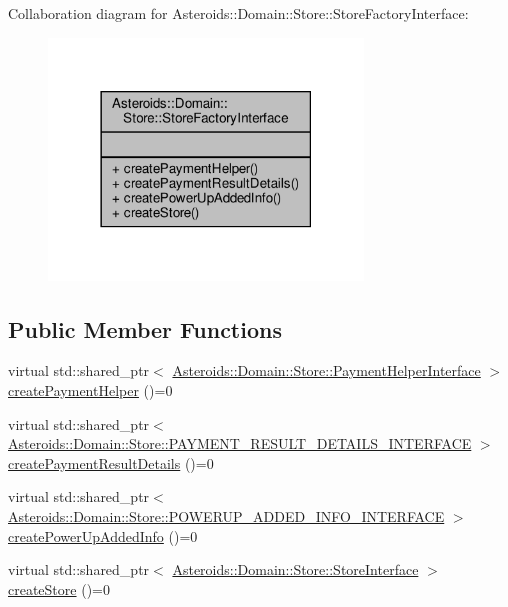 Collaboration diagram for Asteroids\+:\+:Domain\+:\+:Store\+:\+:Store\+Factory\+Interface\+:\nopagebreak
\begin{figure}[H]
\begin{center}
\leavevmode
\includegraphics[width=237pt]{classAsteroids_1_1Domain_1_1Store_1_1StoreFactoryInterface__coll__graph}
\end{center}
\end{figure}
\subsection*{Public Member Functions}
\begin{DoxyCompactItemize}
\item 
virtual std\+::shared\+\_\+ptr$<$ \hyperlink{classAsteroids_1_1Domain_1_1Store_1_1PaymentHelperInterface}{Asteroids\+::\+Domain\+::\+Store\+::\+Payment\+Helper\+Interface} $>$ \hyperlink{classAsteroids_1_1Domain_1_1Store_1_1StoreFactoryInterface_a6b28cbc40f47112d835d89269de1be40}{create\+Payment\+Helper} ()=0
\item 
virtual std\+::shared\+\_\+ptr$<$ \hyperlink{classAsteroids_1_1Domain_1_1Store_1_1PAYMENT__RESULT__DETAILS__INTERFACE}{Asteroids\+::\+Domain\+::\+Store\+::\+P\+A\+Y\+M\+E\+N\+T\+\_\+\+R\+E\+S\+U\+L\+T\+\_\+\+D\+E\+T\+A\+I\+L\+S\+\_\+\+I\+N\+T\+E\+R\+F\+A\+CE} $>$ \hyperlink{classAsteroids_1_1Domain_1_1Store_1_1StoreFactoryInterface_a46a547e9eee1e53a5f423f40ee8ef59e}{create\+Payment\+Result\+Details} ()=0
\item 
virtual std\+::shared\+\_\+ptr$<$ \hyperlink{classAsteroids_1_1Domain_1_1Store_1_1POWERUP__ADDED__INFO__INTERFACE}{Asteroids\+::\+Domain\+::\+Store\+::\+P\+O\+W\+E\+R\+U\+P\+\_\+\+A\+D\+D\+E\+D\+\_\+\+I\+N\+F\+O\+\_\+\+I\+N\+T\+E\+R\+F\+A\+CE} $>$ \hyperlink{classAsteroids_1_1Domain_1_1Store_1_1StoreFactoryInterface_a6cac2d91c8da57941879b15c624b2215}{create\+Power\+Up\+Added\+Info} ()=0
\item 
virtual std\+::shared\+\_\+ptr$<$ \hyperlink{classAsteroids_1_1Domain_1_1Store_1_1StoreInterface}{Asteroids\+::\+Domain\+::\+Store\+::\+Store\+Interface} $>$ \hyperlink{classAsteroids_1_1Domain_1_1Store_1_1StoreFactoryInterface_a90c8a34020605c4c2e311e0997677298}{create\+Store} ()=0
\end{DoxyCompactItemize}


